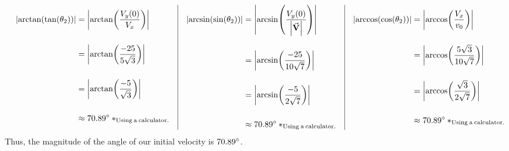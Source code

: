 \documentclass{article}
\begin{document}
{\footnotesize
\[
    \begin{array}{lcl}
        \begin{aligned}[t]
            \abs{\arctan(\tan(\theta_2))} &= \abs{\arctan(\frac{V_y(0)}{V_x})} \\
            \\
            &= \abs{\arctan(\frac{-25}{5\sqrt3})} \\
            \\
            &= \abs{\arctan(\frac{-5}{\sqrt3})} \\
            \\
            &\approx 70.89\degree\:*_\mathrm{Using\:a\:calculator.}
        \end{aligned} 
        \hspace{1em}\vline\hspace{1em}
        \begin{aligned}[t]
            \abs{\arcsin(\sin(\theta_2))} &= \abs{\arcsin(\frac{V_y(0)}{\abs{\va{V}}})} \\
            \\
            &= \abs{\arcsin(\frac{-25}{10\sqrt7})} \\
            \\
            &= \abs{\arcsin(\frac{-5}{2\sqrt7})} \\
            \\
            &\approx 70.89\degree\:*_\mathrm{Using\:a\:calculator.}
        \end{aligned} 
        \hspace{1em}\vline\hspace{1em}
        \begin{aligned}[t]
            \abs{\arccos(\cos(\theta_2))} &= \abs{\arccos(\frac{V_x}{v_0})} \\
            \\
            &= \abs{\arccos(\frac{5\sqrt3}{10\sqrt7})} \\
            \\
            &= \abs{\arccos(\frac{\sqrt3}{2\sqrt7})} \\
            \\
            &\approx 70.89\degree\:*_\mathrm{Using\:a\:calculator.}
        \end{aligned} 
    \end{array}
\]}
Thus, the magnitude of the angle of our initial velocity is $70.89\degree$.
\end{document}
